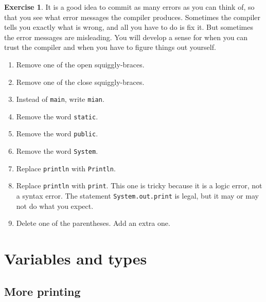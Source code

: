 \documentclass[12pt]{book}
\theoremstyle{definition}
\newtheorem{excz}{Exercise}[chapter]
\newenvironment{exercise}{\bigskip\begin{excz}\mbox{}}{\end{excz}}
\begin{document}
\begin{exercise}

It is a good idea to commit as many errors as you can think of,
so that you see what error messages the compiler produces.
Sometimes the compiler tells you exactly what is wrong, and all
you have to do is fix it.  But sometimes the error messages are
misleading.  You will develop a sense for when you can
trust the compiler and when you have to figure things out yourself.

\begin {enumerate}

\item Remove one of the open squiggly-braces.

\item Remove one of the close squiggly-braces.

\item Instead of {\tt main}, write {\tt mian}.

\item Remove the word {\tt static}.

\item Remove the word {\tt public}.

\item Remove the word {\tt System}.

\item Replace {\tt println} with {\tt Println}.

\item Replace {\tt println} with {\tt print}.  This one is
tricky because it is a logic error, not a syntax error.
The statement {\tt System.out.print} is legal, but it may or may
not do what you expect.

\item Delete one of the parentheses.  Add an extra one.

\end {enumerate}
\end{exercise}






\chapter{Variables and types}
\label{chap02}

\section{More printing}
\end{document}
